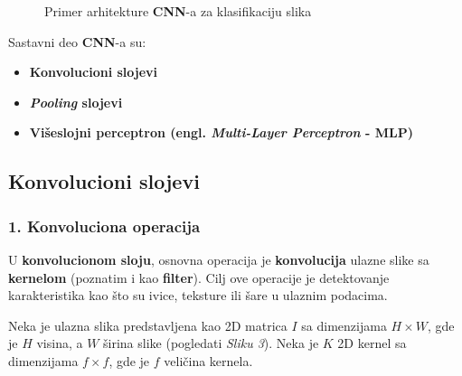 \documentclass[12pt]{article}
\begin{document}
     \begin{figure}[h!]
      \centering
      \caption{Primer arhitekture \textbf{CNN}-a za klasifikaciju slika}
      \label{fig:cnn_architecture}
    \end{figure}
    
    \vspace{0.7cm}
   
    Sastavni deo \textbf{CNN}-a su:
    \begin{itemize}
      \vspace{-0.5cm}
      \setlength\itemsep{0em}
      \item \textbf{Konvolucioni slojevi}
      \item \textbf{\textit{Pooling} slojevi}
      \item \textbf{Višeslojni perceptron (engl. \textbf{\textit{Multi-Layer Perceptron}} - \textbf{MLP})}
   \end{itemize}

   \newpage

   \subsection*{Konvolucioni slojevi}
   \subsubsection*{1. Konvoluciona operacija}
   U \textbf{konvolucionom sloju}, osnovna operacija je \textbf{konvolucija} ulazne slike sa \textbf{kernelom} (poznatim i kao \textbf{filter}).
   Cilj ove operacije je detektovanje karakteristika kao što su ivice, teksture 
   ili šare u ulaznim podacima.

   Neka je ulazna slika predstavljena kao 2D matrica \( I \) 
   sa dimenzijama \( H \times W \), gde je \( H \) visina, 
   a \( W \) širina slike (pogledati \textit{Sliku 3}). Neka je \( K \) 2D kernel sa 
   dimenzijama \( f \times f \), gde je \( f \) veličina kernela.
   
\end{document}

